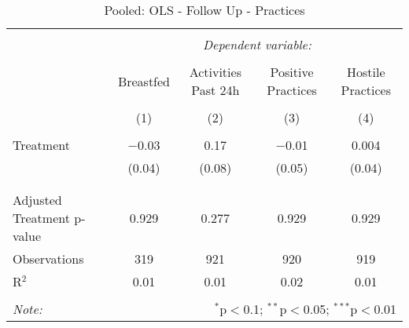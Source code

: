 
\begin{table}[!htbp] \centering 
  \caption{Pooled: OLS - Follow Up - Practices} 
  \label{tbl:Pooled: OLS - Follow Up - Practices} 
\begin{tabular}{@{\extracolsep{5pt}}lcccc} 
\\[-1.8ex]\hline 
\hline \\[-1.8ex] 
 & \multicolumn{4}{c}{\textit{Dependent variable:}} \\ 
\cline{2-5} 
\\[-1.8ex] & Breastfed & Activities Past 24h & Positive Practices & Hostile Practices \\ 
\\[-1.8ex] & (1) & (2) & (3) & (4)\\ 
\hline \\[-1.8ex] 
 Treatment & $-$0.03 & 0.17 & $-$0.01 & 0.004 \\ 
  & (0.04) & (0.08) & (0.05) & (0.04) \\ 
  & & & & \\ 
\hline \\[-1.8ex] 
Adjusted Treatment p-value & 0.929 & 0.277 & 0.929 & 0.929 \\ 
Observations & 319 & 921 & 920 & 919 \\ 
R$^{2}$ & 0.01 & 0.01 & 0.02 & 0.01 \\ 
\hline 
\hline \\[-1.8ex] 
\textit{Note:}  & \multicolumn{4}{r}{$^{*}$p$<$0.1; $^{**}$p$<$0.05; $^{***}$p$<$0.01} \\ 
\end{tabular} 
\end{table} 
